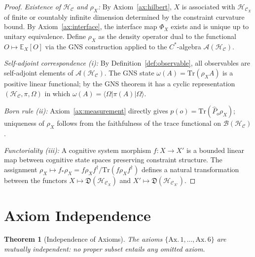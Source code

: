 \documentclass[twocolumn,aps,prd,superscriptaddress,nofootinbib]{revtex4-2}
\newtheorem{theorem}{Theorem}[section]
\newcommand{\HC}{\mathcal{H}_{\mathcal{C}}}
\newcommand{\CA}{\mathcal{A}}
\newcommand{\CB}{\mathcal{B}}
\newcommand{\hatP}{\hat{P}}
\newcommand{\Tr}{\mathrm{Tr}}
\begin{document}
\begin{proof}
\textit{Existence of $\HC$ and $\rho_X$:} By Axiom~\ref{ax:hilbert}, $X$ is
associated with $\HC_X$ of finite or countably infinite dimension determined by
the constraint curvature bound.  By Axiom~\ref{ax:interface}, the interface
map $\Phi_X$ exists and is unique up to unitary equivalence.  Define $\rho_X$
as the density operator dual to the functional $O \mapsto \mathbb{E}_X[O]$
via the GNS construction \cite{GNS1943} applied to the $C^*$-algebra
$\CA(\HC)$.

\textit{Self-adjoint correspondence (i):} By Definition~\ref{def:observable},
all observables are self-adjoint elements of $\CA(\HC)$.  The GNS state
$\omega(A) = \Tr(\rho_X A)$ is a positive linear functional; by the GNS theorem
it has a cyclic representation $(\HC, \pi, \Omega)$ in which
$\omega(A) = \langle\Omega|\pi(A)|\Omega\rangle$.

\textit{Born rule (ii):} Axiom~\ref{ax:measurement} directly gives
$p(o) = \Tr(\hatP_o \rho_X)$; uniqueness of $\rho_X$ follows from the
faithfulness of the trace functional on $\CB(\HC)$.

\textit{Functoriality (iii):} A cognitive system morphism $f: X \to X'$ is a
bounded linear map between cognitive state spaces preserving constraint
structure.  The assignment $\rho_X \mapsto f_*\rho_X = f\rho_X f^\dagger /
\Tr(f\rho_X f^\dagger)$ defines a natural transformation between the
functors $X \mapsto \mathfrak{D}(\HC_X)$ and $X' \mapsto \mathfrak{D}(\HC_{X'})$.
\end{proof}

\section{Axiom Independence}
\label{sec:independence}

\begin{theorem}[Independence of Axioms]
\label{thm:independence}
The axioms $\{\text{Ax.}\,1,\ldots,\text{Ax.}\,6\}$ are mutually independent:
no proper subset entails any omitted axiom.
\end{theorem}
\end{document}
